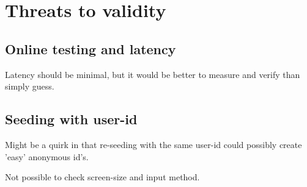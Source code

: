 \section{Threats to validity}

  \subsection{Online testing and latency}

    Latency should be minimal, but it would be better to measure and
    verify than simply guess.

  \subsection{Seeding with user-id}

  Might be a quirk in that re-seeding with the same user-id could
  possibly create 'easy' anonymous id's.

  Not possible to check screen-size and input method.

